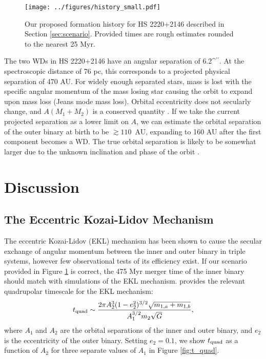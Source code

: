 \documentclass{emulateapj}
\def\asec{\ifmmode^{\prime\prime}\else$^{\prime\prime}$\fi}
\begin{document}
\begin{figure}[t]
\begin{center}
\texttt{[image: ../figures/history\_small.pdf]}
\caption{ Our proposed formation history for HS 2220$+$2146 described in Section \ref{sec:scenario}. Provided times are rough estimates rounded to the nearest 25 Myr. }
\label{fig:scenario}
\end{center}
\end{figure}


The two WDs in HS 2220$+$2146 have an angular separation of 6.2\asec. At the spectroscopic distance of 76 pc, this corresponds to a projected physical separation of 470 AU. For widely enough separated stars, mass is lost with the specific angular momentum of the mass losing star causing the orbit to expand upon mass loss (Jeans mode mass loss). Orbital eccentricity does not secularly change, and $A (M_1 + M_2)$ is a conserved quantity \citep{hadjidemetriou63}. If we take the current projected separation as a lower limit on $A$, we can estimate the orbital separation of the outer binary at birth to be $\gtrsim 110$~AU, expanding to 160 AU after the first component becomes a WD. The true orbital separation is likely to be somewhat larger due to the unknown inclination and phase of the orbit \citep{fischer92}. 



\section{Discussion} \label{sec:discuss}

\subsection{The Eccentric Kozai-Lidov Mechanism}

The eccentric Kozai-Lidov (EKL) mechanism has been shown to cause the secular exchange of angular momentum between the inner and outer binary in triple systems, however few observational tests of its efficiency exist. If our scenario provided in Figure \ref{fig:scenario} is correct, the 475 Myr merger time of the inner binary should match with simulations of the EKL mechanism. \citet{naoz13} provides the relevant quadrupolar timescale for the EKL mechanism:
\begin{equation}
t_{\rm quad} \sim \frac{2 \pi A_2^3 (1-e_2^2)^{3/2} \sqrt{m_{1,a} + m_{1,b}}}{A_1^{3/2}m_2 \sqrt{G}}, \label{eq:t_quad}
\end{equation}
where $A_1$ and $A_2$ are the orbital separations of the inner and outer binary, and $e_2$ is the eccentricity of the outer binary. Setting $e_2 = 0.1$, we show $t_{\rm quad}$ as a function of $A_2$ for three separate values of $A_1$ in Figure \ref{fig:t_quad}.
\end{document}
